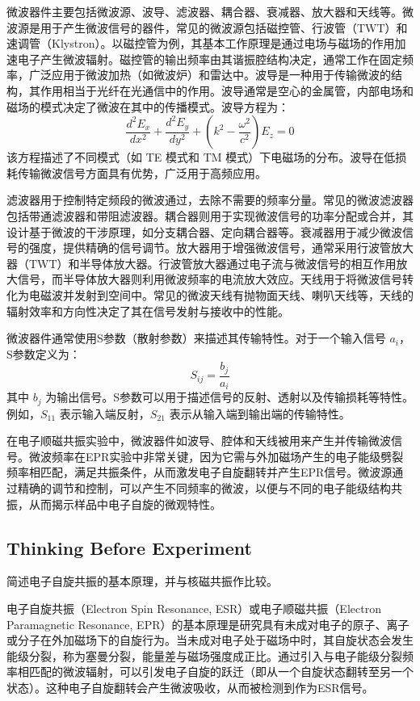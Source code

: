 \begin{enumerate}
	微波器件主要包括微波源、波导、滤波器、耦合器、衰减器、放大器和天线等。微波源是用于产生微波信号的器件，常见的微波源包括磁控管、行波管（TWT）和速调管（Klystron）。以磁控管为例，其基本工作原理是通过电场与磁场的作用加速电子产生微波辐射。磁控管的输出频率由其谐振腔结构决定，通常工作在固定频率，广泛应用于微波加热（如微波炉）和雷达中。波导是一种用于传输微波的结构，其作用相当于光纤在光通信中的作用。波导通常是空心的金属管，内部电场和磁场的模式决定了微波在其中的传播模式。波导方程为：\[ \frac{d^2 E_x}{dx^2} + \frac{d^2 E_y}{dy^2} + \left( k^2 - \frac{\omega^2}{c^2} \right) E_z = 0 \]该方程描述了不同模式（如 TE 模式和 TM 模式）下电磁场的分布。波导在低损耗传输微波信号方面具有优势，广泛用于高频应用。
	
	滤波器用于控制特定频段的微波通过，去除不需要的频率分量。常见的微波滤波器包括带通滤波器和带阻滤波器。耦合器则用于实现微波信号的功率分配或合并，其设计基于微波的干涉原理，如分支耦合器、定向耦合器等。衰减器用于减少微波信号的强度，提供精确的信号调节。放大器用于增强微波信号，通常采用行波管放大器（TWT）和半导体放大器。行波管放大器通过电子流与微波信号的相互作用放大信号，而半导体放大器则利用微波频率的电流放大效应。天线用于将微波信号转化为电磁波并发射到空间中。常见的微波天线有抛物面天线、喇叭天线等，天线的辐射效率和方向性决定了其在信号发射与接收中的性能。
	
	微波器件通常使用S参数（散射参数）来描述其传输特性。对于一个输入信号 \( a_i \)，S参数定义为：\[ S_{ij} = \frac{b_j}{a_i} \]其中 \( b_j \) 为输出信号。S参数可以用于描述信号的反射、透射以及传输损耗等特性。例如，\( S_{11} \) 表示输入端反射，\( S_{21} \) 表示从输入端到输出端的传输特性。
	
	在电子顺磁共振实验中，微波器件如波导、腔体和天线被用来产生并传输微波信号。微波频率在EPR实验中非常关键，因为它需与外加磁场产生的电子能级劈裂频率相匹配，满足共振条件，从而激发电子自旋翻转并产生EPR信号。微波源通过精确的调节和控制，可以产生不同频率的微波，以便与不同的电子能级结构共振，从而揭示样品中电子自旋的微观特性。
\end{enumerate}


\subsection{Thinking Before Experiment}

\begin{question}
	简述电子自旋共振的基本原理，并与核磁共振作比较。
\end{question}
电子自旋共振（Electron Spin Resonance, ESR）或电子顺磁共振（Electron Paramagnetic Resonance, EPR）的基本原理是研究具有未成对电子的原子、离子或分子在外加磁场下的自旋行为。当未成对电子处于磁场中时，其自旋状态会发生能级分裂，称为塞曼分裂，能量差与磁场强度成正比。通过引入与电子能级分裂频率相匹配的微波辐射，可以引发电子自旋的跃迁（即从一个自旋状态翻转至另一个状态）。这种电子自旋翻转会产生微波吸收，从而被检测到作为ESR信号。

